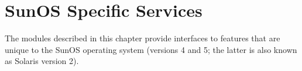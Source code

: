\chapter{SunOS Specific Services}
\label{sunos}

The modules described in this chapter provide interfaces to features
that are unique to the SunOS operating system (versions 4 and 5; the
latter is also known as Solaris version 2).
